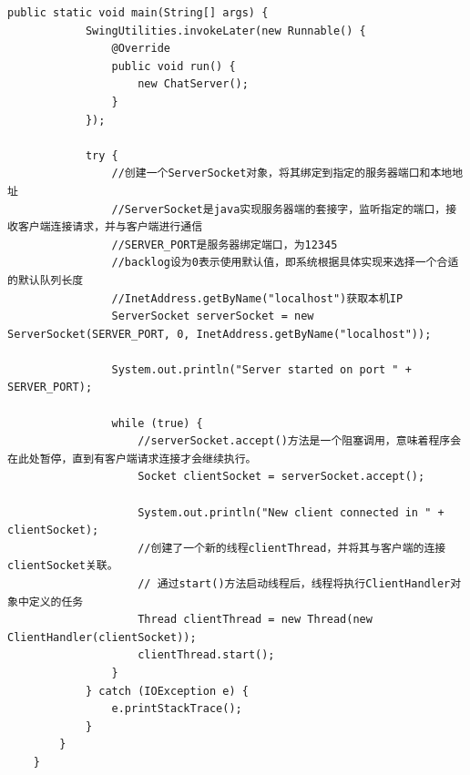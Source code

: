\documentclass[UTF8,12pt]{article}
\begin{document}
\begin{lstlisting}[title=ChatServer.java源代码,frame=shadowbox]
        public static void main(String[] args) {
            SwingUtilities.invokeLater(new Runnable() {
                @Override
                public void run() {
                    new ChatServer();
                }
            });
    
            try {
                //创建一个ServerSocket对象，将其绑定到指定的服务器端口和本地地址
                //ServerSocket是java实现服务器端的套接字，监听指定的端口，接收客户端连接请求，并与客户端进行通信
                //SERVER_PORT是服务器绑定端口，为12345
                //backlog设为0表示使用默认值，即系统根据具体实现来选择一个合适的默认队列长度
                //InetAddress.getByName("localhost")获取本机IP
                ServerSocket serverSocket = new ServerSocket(SERVER_PORT, 0, InetAddress.getByName("localhost"));
    
                System.out.println("Server started on port " + SERVER_PORT);
    
                while (true) {
                    //serverSocket.accept()方法是一个阻塞调用，意味着程序会在此处暂停，直到有客户端请求连接才会继续执行。
                    Socket clientSocket = serverSocket.accept();
    
                    System.out.println("New client connected in " + clientSocket);
                    //创建了一个新的线程clientThread，并将其与客户端的连接clientSocket关联。
                    // 通过start()方法启动线程后，线程将执行ClientHandler对象中定义的任务
                    Thread clientThread = new Thread(new ClientHandler(clientSocket));
                    clientThread.start();
                }
            } catch (IOException e) {
                e.printStackTrace();
            }
        }
    }        
\end{lstlisting}
\end{document}
